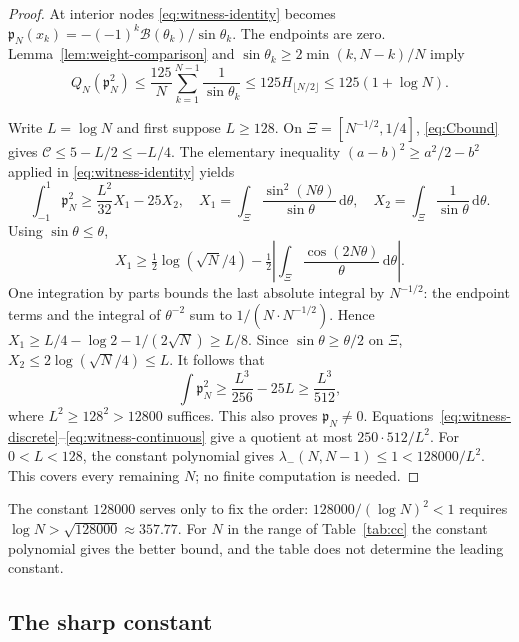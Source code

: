 \documentclass{siamart251216}
\newcommand{\dd}{\,\mathrm d}
\begin{document}
\begin{proof}
At interior nodes \eqref{eq:witness-identity} becomes
$\mathfrak p_N(x_k)=-(-1)^k\mathcal B(\theta_k)/\sin\theta_k$.
The endpoints are zero. Lemma~\ref{lem:weight-comparison} and
$\sin\theta_k\ge2\min(k,N-k)/N$ imply
\begin{equation}\label{eq:witness-discrete}
 Q_N(\mathfrak p_N^2)\le\frac{125}{N}\sum_{k=1}^{N-1}\frac1{\sin\theta_k}
 \le125H_{\lfloor N/2\rfloor}\le125(1+\log N).
\end{equation}

Write $L=\log N$ and first suppose $L\ge128$.
On $\Xi=[N^{-1/2},1/4]$, \eqref{eq:Cbound} gives
$\mathcal C\le5-L/2\le-L/4$. The elementary inequality
$(a-b)^2\ge a^2/2-b^2$ applied in \eqref{eq:witness-identity} yields
\[
 \int_{-1}^1\mathfrak p_N^2\ge\frac{L^2}{32}X_1-25X_2,\quad
 X_1=\int_\Xi\frac{\sin^2(N\theta)}{\sin\theta}\dd\theta,\quad
 X_2=\int_\Xi\frac1{\sin\theta}\dd\theta.
\]
Using $\sin\theta\le\theta$,
\[
 X_1\ge\tfrac12\log(\sqrt N/4)
       -\tfrac12\left|\int_\Xi\frac{\cos(2N\theta)}\theta\dd\theta\right|.
\]
One integration by parts bounds the last absolute integral by $N^{-1/2}$:
the endpoint terms and the integral of $\theta^{-2}$ sum to
$1/(N\cdot N^{-1/2})$. Hence
$X_1\ge L/4-\log2-1/(2\sqrt N)\ge L/8$.
Since $\sin\theta\ge\theta/2$ on $\Xi$, $X_2\le2\log(\sqrt N/4)\le L$.
It follows that
\begin{equation}\label{eq:witness-continuous}
 \int \mathfrak p_N^2\ge\frac{L^3}{256}-25L\ge\frac{L^3}{512},
\end{equation}
where $L^2\ge128^2>12800$ suffices. This also proves $\mathfrak p_N\ne0$.
Equations~\eqref{eq:witness-discrete}--\eqref{eq:witness-continuous}
give a quotient at most $250\cdot512/L^2$.
For $0<L<128$, the constant polynomial gives
$\lambda_-(N,N-1)\le1<128000/L^2$.
This covers every remaining $N$; no finite computation is needed.
\end{proof}

The constant $128000$ serves only to fix the order:
$128000/(\log N)^2<1$ requires $\log N>\sqrt{128000}\approx357.77$. For $N$
in the range of Table~\ref{tab:cc} the constant polynomial gives the better
bound, and the table does not determine the leading constant.

\subsection{The sharp constant}\label{sec:sharp-min}
\end{document}
